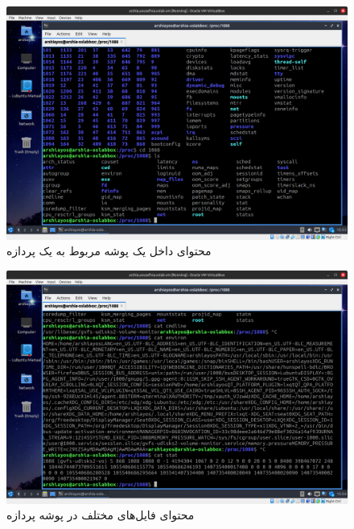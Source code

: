 \documentclass[12pt]{article}
\begin{document}
	\begin{figure}[H]
		\centering
		\includegraphics[width=\textwidth]{report3-resources/10.png}
		\caption{محتوای داخل یک پوشه مربوط به یک پردازه}
		\label{fig:9}
	\end{figure}
	\begin{figure}[H]
		\centering
		\includegraphics[width=\textwidth]{report3-resources/11.png}
		\caption{محتوای فایل‌های مختلف در پوشه پردازه}
		\label{fig:10}
	\end{figure}
\end{document}
